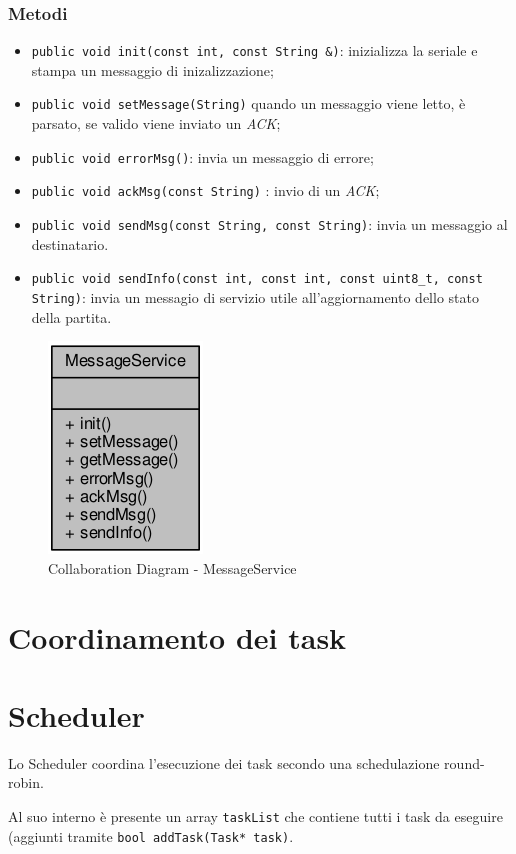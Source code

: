 \subsubsection{Metodi}
\begin{itemize}
	\item \texttt{public void init(const int, const String \&)}: inizializza la seriale e stampa un messaggio di inizalizzazione;
	\item \texttt{public void setMessage(String)}  quando un messaggio viene letto, è parsato, se valido viene inviato un \textit{ACK};
	\item \texttt{public void errorMsg()}: invia un messaggio di errore;
	\item \texttt{public void ackMsg(const String)} : invio di un \textit{ACK};
	\item \texttt{public void sendMsg(const String, const String)}: invia un messaggio al destinatario.
	\item \texttt{public void sendInfo(const int, const int, const uint8\_t, const String)}: invia un messagio di servizio utile all'aggiornamento dello stato della partita.
\end{itemize}
\begin{figure}[!ht]
	\centering
	\includegraphics[scale=.5]{img/UML/CollaborationDiagram/MessageService.png}
	\caption{Collaboration Diagram - MessageService}
\end{figure}

\newpage
\section{Coordinamento dei task}
\section{Scheduler}
Lo Scheduler coordina l'esecuzione dei task secondo una schedulazione round-robin.

Al suo interno è presente un array \texttt{taskList} che contiene tutti i task da eseguire (aggiunti tramite \texttt{bool addTask(Task* task)}.

